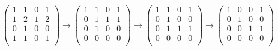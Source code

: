 \documentclass[dvipdfmx]{jsarticle}
\begin{document}
\begin{align*}
\begin{pmatrix}
1 & 1 & 0 & 1 \\
1 & 2 & 1 & 2 \\
0 & 1 & 0 & 0 \\
1 & 1 & 0 & 1 \\
\end{pmatrix} \rightarrow \begin{pmatrix}
1 & 1 & 0 & 1 \\
0 & 1 & 1 & 1 \\
0 & 1 & 0 & 0 \\
0 & 0 & 0 & 0 \\
\end{pmatrix} \rightarrow \begin{pmatrix}
1 & 1 & 0 & 1 \\
0 & 1 & 0 & 0 \\
0 & 1 & 1 & 1 \\
0 & 0 & 0 & 0 \\
\end{pmatrix} \rightarrow \begin{pmatrix}
1 & 0 & 0 & 1 \\
0 & 1 & 0 & 0 \\
0 & 0 & 1 & 1 \\
0 & 0 & 0 & 0 \\
\end{pmatrix}
\end{align*}
\end{document}
